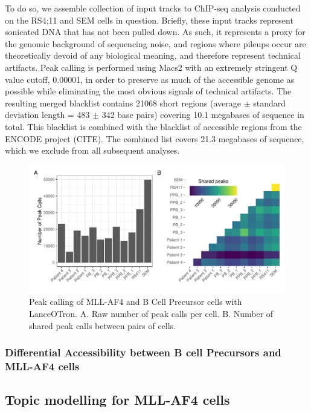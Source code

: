 To do so, we assemble collection of input tracks to ChIP-seq analysis conducted on the RS4;11 and SEM cells in question. Briefly, these input tracks represent sonicated DNA that has not been pulled down. As such, it represents a proxy for the genomic background of sequencing noise, and regions where pileups occur are theoretically devoid of any biological meaning, and therefore represent technical artifacts. Peak calling is performed using Macs2 with an extremely stringent Q value cutoff, 0.00001, in order to preserve as much of the accessible genome as possible while eliminating the most obvious signals of technical artifacts. The resulting merged blacklist contains 21068 short regions (average $\pm$ standard deviation length = 483 $\pm$ 342 base pairs) covering 10.1 megabases of sequence in total. This blacklist is combined with the blacklist of accessible regions from the ENCODE project (CITE). The combined list covers 21.3 megabases of sequence, which we exclude from all subsequent analyses.

\begin{figure}
    \centering
    \includegraphics[width=\textwidth]{plot/ch5/mll_shared_peaks.pdf}
    \caption{Peak calling of MLL-AF4 and B Cell Precursor cells with LanceOTron. A. Raw number of peak calls per cell. B. Number of shared peak calls between pairs of cells.}
    \label{fig:mll_peak_calls}
\end{figure}

\subsubsection{Differential Accessibility between B cell Precursors and MLL-AF4 cells} \label{ch5:mll_diffacc}


\subsection{Topic modelling for MLL-AF4 cells}


